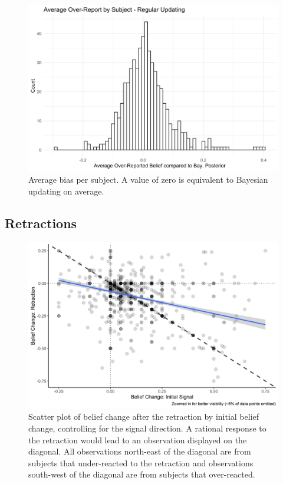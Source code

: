 \documentclass{article}
\begin{document}
\vspace{1cm}

\begin{figure}[!ht]
    \centering
    \includegraphics[width=12cm]{Fig/02_fig_belief_distance_type_avg.jpg}
    \caption{Average bias per subject. A value of zero is equivalent to Bayesian updating on average.}
    \label{fig:regular_belief_diff_type}
\end{figure}

\newpage
\subsection{Retractions}

\begin{figure}[!htb]
    \centering
    \includegraphics[width = 12cm]{Fig/02_fig_retract_change_lm.jpg}
    \caption{Scatter plot of belief change after the retraction by initial belief change, controlling for the signal direction. A rational response to the retraction would lead to an observation displayed on the diagonal. All observations north-east of the diagonal are from subjects that under-reacted to the retraction and observations south-west of the diagonal are from subjects that over-reacted.}
    \label{fig:retract_change}
\end{figure}
\end{document}
